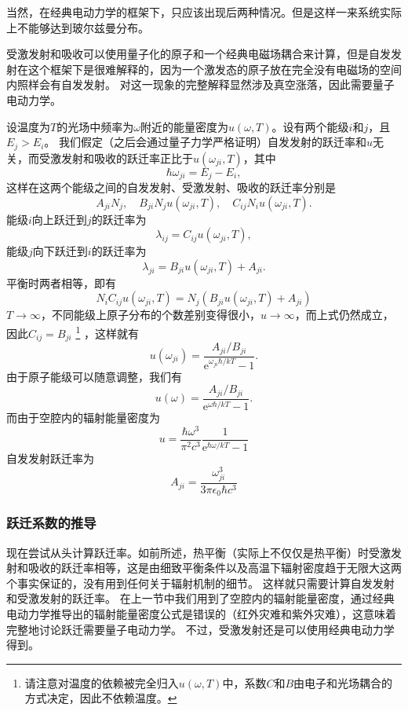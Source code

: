 \documentclass[UTF8, a4paper]{ctexart}
\newcommand*{\ee}{\mathrm{e}}
\begin{document}
当然，在经典电动力学的框架下，只应该出现后两种情况。但是这样一来系统实际上不能够达到玻尔兹曼分布。

受激发射和吸收可以使用量子化的原子和一个经典电磁场耦合来计算，但是自发发射在这个框架下是很难解释的，因为一个激发态的原子放在完全没有电磁场的空间内照样会有自发发射。
对这一现象的完整解释显然涉及真空涨落，因此需要量子电动力学。

设温度为$T$的光场中频率为$\omega$附近的能量密度为$u(\omega, T)$。设有两个能级$i$和$j$，且$E_j > E_i$。
我们假定（之后会通过量子力学严格证明）自发发射的跃迁率和$u$无关，而受激发射和吸收的跃迁率正比于$u(\omega_{ji}, T)$，其中
\begin{equation}
    \hbar \omega_{ji} = E_j - E_i,
    \label{eq:photon-energy}
\end{equation}
这样在这两个能级之间的自发发射、受激发射、吸收的跃迁率分别是
\[
    A_{ji} N_j, \quad B_{ji} N_j u(\omega_{ji}, T), \quad C_{ij} N_i u(\omega_{ji}, T).
\]
能级$i$向上跃迁到$j$的跃迁率为
\[
    \lambda_{ij} = C_{ij} u(\omega_{ji}, T),
\]
能级$j$向下跃迁到$i$的跃迁率为
\[
    \lambda_{ji} = B_{ji} u(\omega_{ji}, T) + A_{ji}.
\]
平衡时两者相等，即有
\[
    N_i C_{ij} u(\omega_{ji}, T) = N_j (B_{ji} u(\omega_{ji}, T) + A_{ji})
\]
$T \to \infty$，不同能级上原子分布的个数差别变得很小，$u \to \infty$，而上式仍然成立，因此$C_{ij} = B_{ji}$%
\footnote{请注意对温度的依赖被完全归入$u(\omega, T)$中，系数$C$和$B$由电子和光场耦合的方式决定，因此不依赖温度。}%
，这样就有
\[
    u(\omega_{ji}) = \frac{A_{ji} / B_{ji}}{\ee^{\omega_{ji} \hbar / k T} - 1}.
\]
由于原子能级可以随意调整，我们有
\[
    u(\omega) = \frac{A_{ji} / B_{ji}}{\ee^{\omega \hbar / k T} - 1}.
\]
而由于空腔内的辐射能量密度为
\[
    u = \frac{\hbar \omega^3}{\pi^2 c^3} \frac{1}{\ee^{\hbar \omega / kT} - 1}
\]
自发发射跃迁率为
\[
    A_{ji} = \frac{\omega_{ji}^3}{3\pi \epsilon_0 \hbar c^3}
\]

\subsubsection{跃迁系数的推导}\label{sec:electro-dipole-hopping}

现在尝试从头计算跃迁率。如前所述，热平衡（实际上不仅仅是热平衡）时受激发射和吸收的跃迁率相等，这是由细致平衡条件以及高温下辐射密度趋于无限大这两个事实保证的，没有用到任何关于辐射机制的细节。
这样就只需要计算自发发射和受激发射的跃迁率。
在上一节中我们用到了空腔内的辐射能量密度，通过经典电动力学推导出的辐射能量密度公式是错误的（红外灾难和紫外灾难），这意味着完整地讨论跃迁需要量子电动力学。
不过，受激发射还是可以使用经典电动力学得到。
\end{document}
